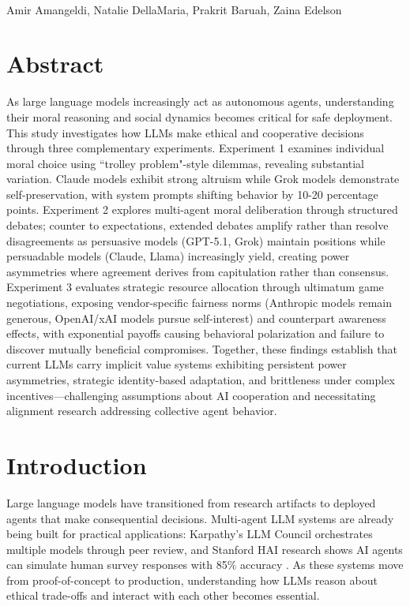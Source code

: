 \documentclass[10pt,letterpaper]{article}
\begin{document}
\vspace*{0.35in}

\begin{flushleft}
{\Large
\textbf{}
}
\newline
\\
Amir Amangeldi,
Natalie DellaMaria,
Prakrit Baruah,
Zaina Edelson
\end{flushleft}

\section{Abstract}
As large language models increasingly act as autonomous agents, understanding their moral reasoning and social dynamics becomes critical for safe deployment. This study investigates how LLMs make ethical and cooperative decisions through three complementary experiments. Experiment 1 examines individual moral choice using ``trolley problem"-style dilemmas, revealing substantial variation. Claude models exhibit strong altruism while Grok models demonstrate self-preservation, with system prompts shifting behavior by 10-20 percentage points. Experiment 2 explores multi-agent moral deliberation through structured debates; counter to expectations, extended debates amplify rather than resolve disagreements as persuasive models (GPT-5.1, Grok) maintain positions while persuadable models (Claude, Llama) increasingly yield, creating power asymmetries where agreement derives from capitulation rather than consensus. Experiment 3 evaluates strategic resource allocation through ultimatum game negotiations, exposing vendor-specific fairness norms (Anthropic models remain generous, OpenAI/xAI models pursue self-interest) and counterpart awareness effects, with exponential payoffs causing behavioral polarization and failure to discover mutually beneficial compromises. Together, these findings establish that current LLMs carry implicit value systems exhibiting persistent power asymmetries, strategic identity-based adaptation, and brittleness under complex incentives—challenging assumptions about AI cooperation and necessitating alignment research addressing collective agent behavior.
\bigskip

\section{Introduction}
Large language models have transitioned from research artifacts to deployed agents that make consequential decisions. Multi-agent LLM systems are already being built for practical applications: Karpathy's LLM Council \cite{karpathy:llm-council} orchestrates multiple models through peer review, and Stanford HAI research shows AI agents can simulate human survey responses with 85\% accuracy \cite{park2024simulating}. As these systems move from proof-of-concept to production, understanding how LLMs reason about ethical trade-offs and interact with each other becomes essential.
\end{document}
